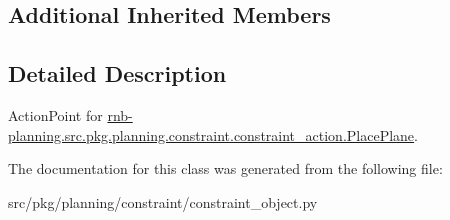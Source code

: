 \subsection*{Additional Inherited Members}


\subsection{Detailed Description}
Action\+Point for \hyperlink{classrnb-planning_1_1src_1_1pkg_1_1planning_1_1constraint_1_1constraint__action_1_1_place_plane}{rnb-\/planning.\+src.\+pkg.\+planning.\+constraint.\+constraint\+\_\+action.\+Place\+Plane}. 

The documentation for this class was generated from the following file\+:\begin{DoxyCompactItemize}
\item 
src/pkg/planning/constraint/constraint\+\_\+object.\+py\end{DoxyCompactItemize}
